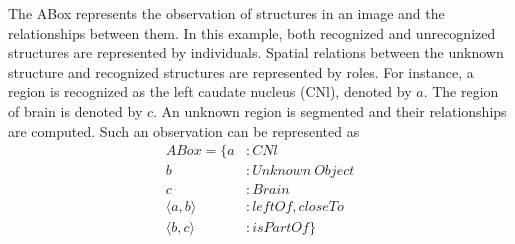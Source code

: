 \documentclass{article}
\begin{document}
The ABox represents the observation of structures in an image and the relationships between them.
In this example, both recognized and unrecognized structures are represented by individuals. Spatial relations between the unknown structure and
recognized structures are represented by roles.
For instance, a region is recognized as the left caudate nucleus (CNl), denoted by $a$.
The region of brain is denoted by $c$. An unknown region is segmented and their relationships are computed.  
Such an observation can be represented as
\begin{align*}
 ABox=\{ a&: CNl \\
	 b&: Unknown~Object \\
	 c&: Brain \\
	 \langle a,b\rangle &: leftOf, closeTo \\
	 \langle b,c\rangle &: isPartOf\}
\end{align*}
\end{document}
